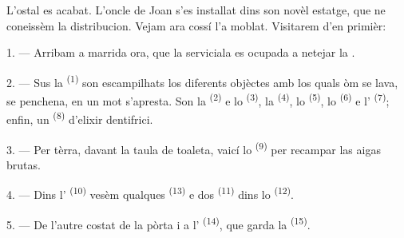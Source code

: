 %
%

\VUsaut{6.0mm}
\VUsaut{1.4mm}
\VUsaut{0.4mm}
\VUsaut{2.2mm}

L'ostal es acabat. L'oncle de Joan s'es installat dins son novèl estatge, que ne
coneissèm la distribucion. Vejam ara cossí l'a moblat. Visitarem d'en primièr:

\VUsaut{3.0mm}

1. --- Arribam a marrida ora, que la serviciala es ocupada a netejar la
.

2. --- Sus la  \textsuperscript{(1)} son escampilhats los
diferents objèctes amb los quals òm se lava, se penchena, en un mot s'apresta. Son
la  \textsuperscript{(2)} e lo 
\textsuperscript{(3)}, la  \textsuperscript{(4)}, lo
 \textsuperscript{(5)}, lo  \textsuperscript{(6)} e
l' \textsuperscript{(7)}; enfin, un 
\textsuperscript{(8)} d'elixir dentifrici.

3. --- Per tèrra, davant la taula de toaleta, vaicí lo 
\textsuperscript{(9)} per recampar las aigas brutas.

4. --- Dins l' \textsuperscript{(10)} vesèm qualques
 \textsuperscript{(13)} e dos 
\textsuperscript{(11)} dins lo  \textsuperscript{(12)}.

5. --- De l'autre costat de la pòrta i a l'
\textsuperscript{(14)}, que garda la  \textsuperscript{(15)}.

